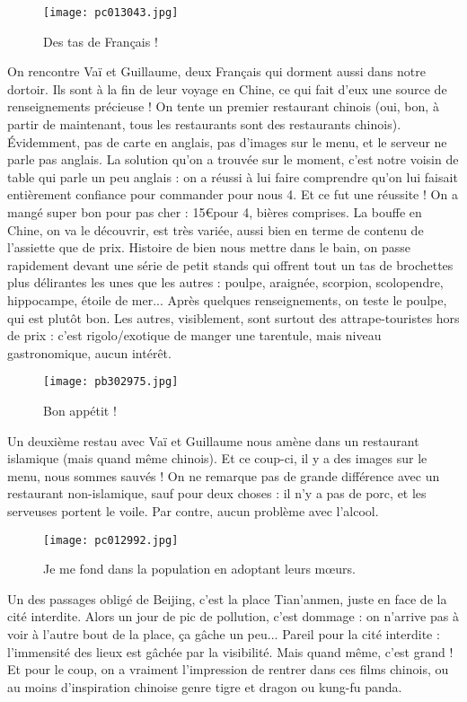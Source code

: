 \documentclass{book}
\begin{document}
\begin{figure}[h]
\centering
\texttt{[image: pc013043.jpg]}
\caption*{ Des tas de Français !}
\end{figure}

On rencontre Vaï et Guillaume, deux Français qui dorment aussi dans notre dortoir. Ils sont à la fin de leur voyage en Chine, ce qui fait d'eux une source de renseignements précieuse ! On tente un premier restaurant chinois (oui, bon, à partir de maintenant, tous les restaurants sont des restaurants chinois). Évidemment, pas de carte en anglais, pas d'images sur le menu, et le serveur ne parle pas anglais. La solution qu'on a trouvée sur le moment, c'est notre voisin de table qui parle un peu anglais : on a réussi à lui faire comprendre qu'on lui faisait entièrement confiance pour commander pour nous 4. Et ce fut une réussite ! On a mangé super bon pour pas cher : 15\euro pour 4, bières comprises. La bouffe en Chine, on va le découvrir, est très variée, aussi bien en terme de contenu de l'assiette que de prix. Histoire de bien nous mettre dans le bain, on passe rapidement devant une série de petit stands qui offrent tout un tas de brochettes plus délirantes les unes que les autres : poulpe, araignée, scorpion, scolopendre, hippocampe, étoile de mer... Après quelques renseignements, on teste le poulpe, qui est plutôt bon. Les autres, visiblement, sont surtout des attrape-touristes hors de prix : c'est rigolo/exotique de manger une tarentule, mais niveau gastronomique, aucun intérêt.


\begin{figure}[h]
\centering
\texttt{[image: pb302975.jpg]}
\caption*{ Bon appétit !}
\end{figure}

Un deuxième restau avec Vaï et Guillaume nous amène dans un restaurant islamique (mais quand même chinois). Et ce coup-ci, il y a des images sur le menu, nous sommes sauvés ! On ne remarque pas de grande différence avec un restaurant non-islamique, sauf pour deux choses : il n'y a pas de porc, et les serveuses portent le voile. Par contre, aucun problème avec l'alcool.


\begin{figure}[h]
\centering
\texttt{[image: pc012992.jpg]}
\caption*{ Je me fond dans la population en adoptant leurs mœurs.}
\end{figure}

Un des passages obligé de Beijing, c'est la place Tian'anmen, juste en face de la cité interdite. Alors un jour de pic de pollution, c'est dommage : on n'arrive pas à voir à l'autre bout de la place, ça gâche un peu... Pareil pour la cité interdite : l'immensité des lieux est gâchée par la visibilité. Mais quand même, c'est grand ! Et pour le coup, on a vraiment l'impression de rentrer dans ces films chinois, ou au moins d'inspiration chinoise genre tigre et dragon ou kung-fu panda.
\end{document}
